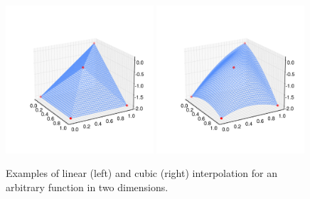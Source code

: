 \begin{figure}
  \centering
  \includegraphics[width=0.49\textwidth]{Figures/Dihiggs/interp_toy_linear.pdf}
  \includegraphics[width=0.49\textwidth]{Figures/Dihiggs/interp_toy_cubic.pdf}
  \caption[Toy Examples of Linear and Cubic Interpolation in 2D]{Examples of linear (left) and cubic (right) interpolation for an arbitrary function in two dimensions.}\label{fig:2d_interp_toy_example}
\end{figure}

